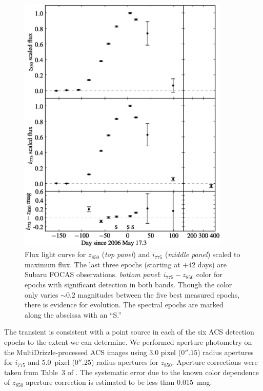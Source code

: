 \begin{figure}
\begin{center}
\includegraphics[width=0.9\textwidth]{figures/scp06f6/lightcurve.eps}
\end{center}
\caption[Light curve of SN SCP06F6]{Flux light curve for $z_{850}$
  (\emph{top panel}) and $i_{775}$ (\emph{middle panel}) scaled to
  maximum flux.  The last three epochs (starting at +42 days) are
  Subaru FOCAS observations.  \emph{bottom panel}: $i_{775} - z_{850}$
  color for epochs with significant detection in both bands. Though
  the color only varies $\sim 0.2$ magnitudes between the five best
  measured epochs, there is evidence for evolution.  The spectral
  epochs are marked along the abscissa with an ``S.''
	 \label{fig:lightcurve}}
\end{figure}

The transient is consistent with a point source in each of the six ACS 
detection epochs to the extent we can determine.
We performed aperture photometry on the {\sc MultiDrizzle}-processed ACS images
using 3.0 pixel ($0''.15$) radius apertures for $i_{775}$ and 5.0~pixel 
($0''.25$) radius apertures for $z_{850}$. Aperture corrections were taken 
from Table~3 of \citet{sirianni05a}. The systematic error due to the known 
color dependence of $z_{850}$ aperture correction \citep[see][]{sirianni05a} 
is estimated to be less than 0.015~mag.

